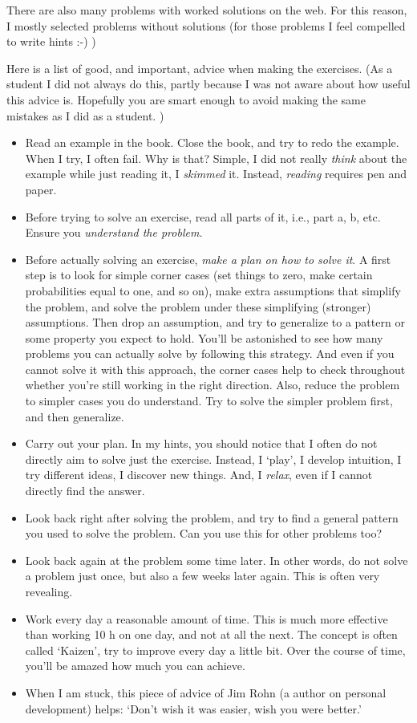 \documentclass[a4paper]{article}
\theoremstyle{definition}
\newcommand{\1}[1]{\,I_{#1}} %
\begin{document}
There are also many problems with worked solutions on the web.
For this reason, I mostly selected problems without solutions (for those problems I feel compelled to write hints :-) )



Here is a list of good, and important, advice when making the exercises.
(As a student I did not always do this, partly because I was not aware about how useful this advice is. Hopefully you are smart enough to avoid making the same mistakes as I did as a student.
)
\begin{itemize}
\item Read an example in the book. Close the book, and try to redo the example. When I try, I often fail. Why is that? Simple, I did not really \emph{think} about the example while just reading it, I \emph{skimmed} it.  Instead, \emph{reading} requires pen and paper.
\item Before trying to solve an exercise, read all parts of it, i.e., part a, b, etc. Ensure you \emph{understand the problem.}
\item Before actually solving  an exercise, \emph{make a plan on how to solve it}. A first step is to look for simple corner cases (set things to zero, make certain probabilities equal to one, and so on), make extra assumptions that simplify the problem, and solve the problem under these simplifying (stronger) assumptions. Then drop an assumption, and try to generalize to a pattern or some property you expect to hold. You'll be astonished to see how many problems you can actually solve by following this strategy. And even if you cannot solve it with this approach, the corner cases help to check throughout whether you're still working in the right direction. Also, reduce the problem to simpler cases you do understand. Try to solve the simpler problem first, and then generalize.
\item Carry out your plan. In my hints, you should notice that I often do not directly aim to solve just the exercise. Instead, I `play', I develop intuition, I try different ideas, I discover new things. And, I \emph{relax}, even if I cannot directly find the answer.
\item Look back right after solving the problem, and try to find a general pattern you used to solve the problem. Can you use this for other problems too?
\item Look back again at the problem some time later. In other words, do not solve  a problem just once, but also a few weeks later again. This is often very revealing.
\item Work every day a reasonable amount of time. This is much more effective than working 10 h on one day, and not at all the next. The concept is often called `Kaizen', try to improve every day a little bit. Over the course of time, you'll be amazed how much you can achieve.
\item When I am stuck, this piece of advice of Jim Rohn (a author on personal development) helps: `Don't wish it was easier, wish you were better.'
\end{itemize}
\end{document}
